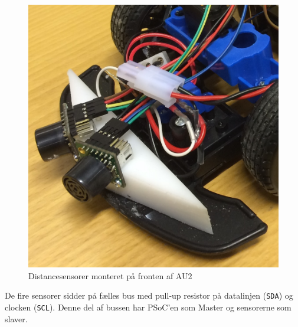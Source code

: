 \begin{figure}[ht]
	\centering
	\includegraphics[scale=0.1]{../fig/billeder/distancesensor_montering.jpg}
	\caption{Distancesensorer monteret på fronten af AU2}
	\label{fig:ds_mont}
\end{figure}

De fire sensorer sidder på fælles \IIC bus med pull-up resistor på datalinjen (\texttt{SDA}) og clocken (\texttt{SCL}). Denne del af bussen har PSoC'en som Master og sensorerne som slaver. 

